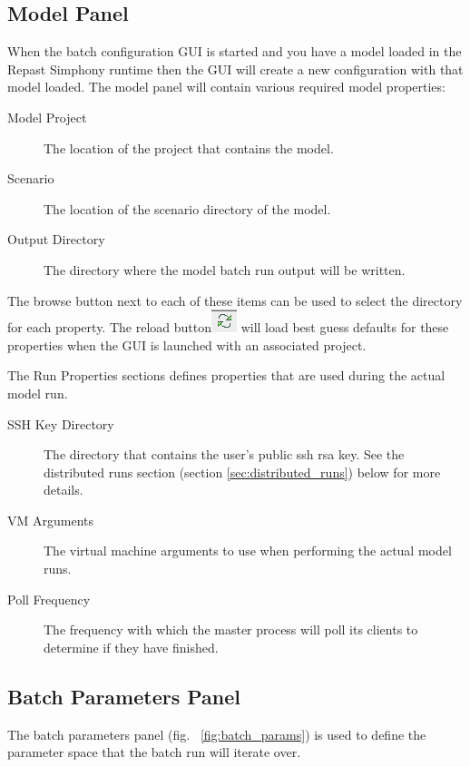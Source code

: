 \documentclass[11pt]{amsart}
\begin{document}
\subsection{Model Panel}
When the batch configuration GUI is started and you have a model loaded in the Repast Simphony runtime then the GUI will create a new configuration with that model loaded. The model panel will contain various required model properties:

\begin{description}
\item[Model Project] The location of the project that contains the model. 
\item[Scenario] The location of the scenario directory of the model. 
\item[Output Directory] The directory where the model batch run output will be written.
\end{description}

The browse button next to each of these items can be used to select the directory for each property. The reload button\includegraphics[height=.2in]{images/reload_button.png}  will load best guess defaults for these properties when the GUI is launched with an associated project.

The Run Properties sections defines properties that are used during the actual model run. 

\begin{description}
\item[SSH Key Directory] The directory that contains the user's public ssh rsa key. See the distributed runs section (section \ref{sec:distributed_runs}) below for more details.
\item[VM Arguments] The virtual machine arguments to use when performing the actual model runs.
\item[Poll Frequency] The frequency with which the master process will poll its clients to determine if they have finished.\end{description}

\subsection{Batch Parameters Panel}
The batch parameters panel (fig. ~\ref{fig:batch_params})  is used to define the parameter space that the batch run will iterate over. 
\end{document}
